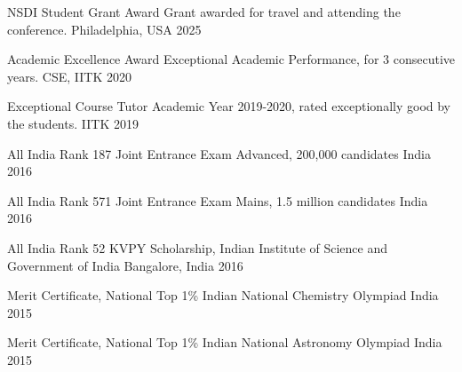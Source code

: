 
\begin{cvhonors}

  \cvhonor
    {NSDI Student Grant Award} %
    {Grant awarded for travel and attending the conference.} %
    {Philadelphia, USA} %
    {2025} %

  \cvhonor
    {Academic Excellence Award} %
    {Exceptional Academic Performance, for 3 consecutive years.} %
    {CSE, IITK} %
    {2020} %

  \cvhonor
    {Exceptional Course Tutor} %
    {Academic Year 2019-2020, rated exceptionally good by the students.} %
    {IITK} %
    {2019} %

  \cvhonor
    {All India Rank 187} %
    {Joint Entrance Exam Advanced, 200,000 candidates} %
    {India} %
    {2016} %

  \cvhonor
    {All India Rank 571} %
    {Joint Entrance Exam Mains, 1.5 million candidates} %
    {India} %
    {2016} %

  \cvhonor
    {All India Rank 52} %
    {KVPY Scholarship, Indian Institute of Science and Government of India} %
    {Bangalore, India} %
    {2016} %

  \cvhonor
    {Merit Certificate, National Top 1\%} %
    {Indian National Chemistry Olympiad} %
    {India} %
    {2015} %

  \cvhonor
    {Merit Certificate, National Top 1\%} %
    {Indian National Astronomy Olympiad} %
    {India} %
    {2015} %

\end{cvhonors}
